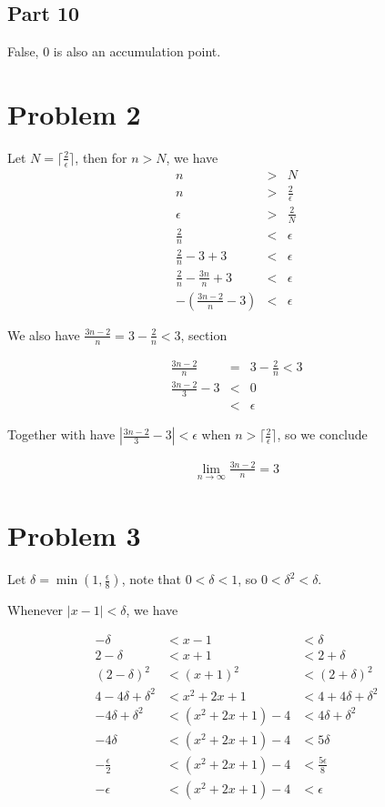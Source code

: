 \documentclass{article}
\begin{document}
\subsection*{Part 10}
False, 0 is also an accumulation point.

\section*{Problem 2}
Let $ N = \lceil \frac{2}{\epsilon} \rceil $, then for $ n > N $, we have
\begin{eqnarray*}
              n & > & N \\
              n & > & \frac{2}{\epsilon} \\
       \epsilon & > & \frac{2}{N} \\
    \frac{2}{n} & < & \epsilon \\
    \frac{2}{n} - 3 + 3 & < & \epsilon \\
    \frac{2}{n} - \frac{3n}{n} + 3 & < & \epsilon \\
    -(\frac{3n - 2}{n} - 3) & < & \epsilon
\end{eqnarray*}

We also have $ \frac{3n - 2}{n} = 3 - \frac{2}{n} < 3 $, section

\begin{eqnarray*}
      \frac{3n - 2}{n} &=& 3 - \frac{2}{n} < 3 \\
  \frac{3n - 2}{3} - 3 &<& 0 \\
                       &<& \epsilon
\end{eqnarray*}

Together with have $ |\frac{3n - 2}{3} - 3| < \epsilon $ when $ n > \lceil \frac{2}{\epsilon} \rceil $, so we conclude

\begin{eqnarray}
    \lim_{n \to \infty} \frac{3n - 2}{n} = 3
\end{eqnarray}

\section*{Problem 3}
Let $ \delta = \min (1, \frac{\epsilon}{8}) $, note that $ 0 < \delta < 1 $, so $ 0 < \delta^2 < \delta $.

Whenever $ | x - 1 | < \delta $, we have

\begin{eqnarray*}
    -\delta &< x - 1 &< \delta \\
    2 -\delta &< x + 1 &< 2 + \delta \\
    (2 -\delta)^2 &< (x + 1)^2 &< (2 + \delta)^2 \\
    4 - 4\delta + \delta^2 &< x^2 + 2x + 1 &< 4 + 4\delta + \delta^2 \\
    -4\delta + \delta^2 &< (x^2 + 2x + 1) - 4 &< 4\delta + \delta^2 \\
    -4\delta &< (x^2 + 2x + 1) - 4 &< 5\delta \\
    -\frac{\epsilon}{2} &< (x^2 + 2x + 1) - 4 &< \frac{5\epsilon}{8} \\
    -\epsilon &< (x^2 + 2x + 1) - 4 &< \epsilon
\end{eqnarray*}
\end{document}
